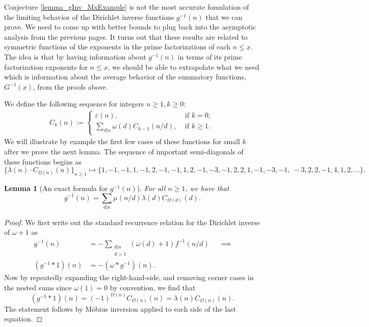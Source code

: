 \documentclass[11pt,reqno,a4letter]{article}
\numberwithin{figure}{section}
\numberwithin{table}{section}
\newcommand{\seqnum}[1]{\href{http://oeis.org/#1}{\color{ProcessBlue}{\underline{#1}}}}
\theoremstyle{plain}
\newtheorem{lemma}[theorem]{Lemma}
\numberwithin{theorem}{section}
\theoremstyle{definition}
\begin{document}
Conjecture \ref{lemma_gInv_MxExample} is not the most accurate fomulation of the limiting behavior of the 
Dirichlet inverse functions $g^{-1}(n)$ that we can prove. 
We need to come up with better bounds to plug back into the asymptotic analysis from the 
previous pages. It turns out that these results are related to symmetric functions of the exponents in the 
prime factorizations of each $n \leq x$. The idea is that by having information about $g^{-1}(n)$ 
in terms of its prime factorization exponents for $n \leq x$, we should be able to extrapolate 
what we need which is information about the average behavior of the summatory functions, $G^{-1}(x)$, 
from the proofs above. 

We define the following sequence for integers $n \geq 1, k \geq 0$: 
\begin{align} 
C_k(n) := \begin{cases} 
     \varepsilon(n), & \text{ if $k = 0$; } \\ 
     \sum\limits_{d|n} \omega(d) C_{k-1}(n/d), & \text{ if $k \geq 1$. } 
     \end{cases} 
\end{align} 
We will illustrate by example the first few cases of these functions for small $k$ after we prove 
the next lemma. 
The sequence of important semi-diagonals of these functions begins as 
\cite[\seqnum{A008480}]{OEIS} 
\[
\{\lambda(n) \cdot C_{\Omega(n)}(n) \}_{n \geq 1} \mapsto \{
     1, -1, -1, 1, -1, 2, -1, -1, 1, 2, -1, -3, -1, 2, 2, 1, -1, -3, -1, \
     -3, 2, 2, -1, 4, 1, 2, \ldots \}. 
\]

\begin{lemma}[An exact formula for $g^{-1}(n)$] 
\label{lemma_AnExactFormulaFor_gInvByMobiusInv_v1} 
For all $n \geq 1$, we have that 
\[
g^{-1}(n) = \sum_{d|n} \mu(n/d) \lambda(d) C_{\Omega(d)}(d). 
\]
\end{lemma}
\begin{proof} 
We first write out the standard recurrence relation for the Dirichlet inverse of 
$\omega+1$ as 
\begin{align*} 
g^{-1}(n) & = - \sum_{\substack{d|n \\ d>1}} (\omega(d) + 1) f^{-1}(n/d) && \implies \\ 
     (g^{-1} \ast 1)(n) & = -(\omega \ast g^{-1})(n). 
\end{align*} 
Now by repeatedly expanding the right-hand-side, and removing corner cases in the nested sums since 
$\omega(1) = 0$ by convention, we find that 
\[
(g^{-1} \ast 1)(n) = (-1)^{\Omega(n)} C_{\Omega(n)}(n) = \lambda(n) C_{\Omega(n)}(n). 
\]
The statement follows by M\"obius inversion applied to each side of the last equation. 
\end{proof}
\end{document}

